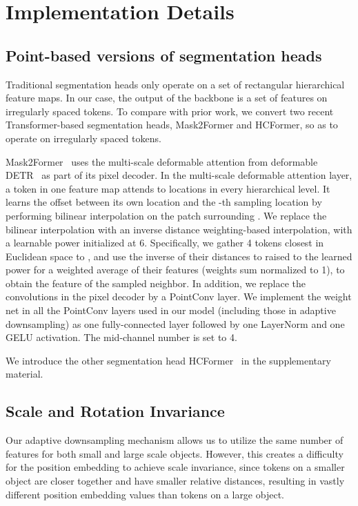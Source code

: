 \documentclass[10pt,twocolumn,letterpaper]{article}
\begin{document}
\section{Implementation Details}
\subsection{Point-based versions of segmentation heads}\label{sec:mask2former}

Traditional segmentation heads only operate on a set of rectangular hierarchical feature maps. In our case, the output of the backbone is a set of features on irregularly spaced tokens. To compare with prior work, we convert two recent Transformer-based segmentation heads, Mask2Former and HCFormer, so as to operate on irregularly spaced tokens. 

Mask2Former~\cite{mask2} uses the multi-scale deformable attention from deformable DETR~\cite{deformable} as part of its pixel decoder. In the multi-scale deformable attention layer, a token in one feature map attends to  locations in every hierarchical level. It learns the offset  between its own location  and the -th sampling location  by performing bilinear interpolation on the  patch surrounding . We replace the bilinear interpolation with an inverse distance weighting-based interpolation, with a learnable power initialized at 6. Specifically, we gather 4 tokens closest in Euclidean space to , and use the inverse of their distances to  raised to the learned power for a weighted average of their features (weights sum normalized to 1), to obtain the feature of the sampled neighbor. In addition, we replace the  convolutions in the pixel decoder by a PointConv layer. We implement the weight net  in all the PointConv layers used in our model (including those in adaptive downsampling) as one fully-connected layer followed by one LayerNorm and one GELU activation. The mid-channel number  is set to 4.

We introduce the other segmentation head HCFormer~\cite{hcformer} in the supplementary material.

\subsection{Scale and Rotation Invariance}

Our adaptive downsampling mechanism allows us to utilize the same number of features for both small and large scale objects. However, this creates a difficulty for the position embedding to achieve scale invariance, since tokens on a smaller object are closer together and have smaller relative distances, resulting in vastly different position embedding values than tokens on a large object. 
\end{document}
